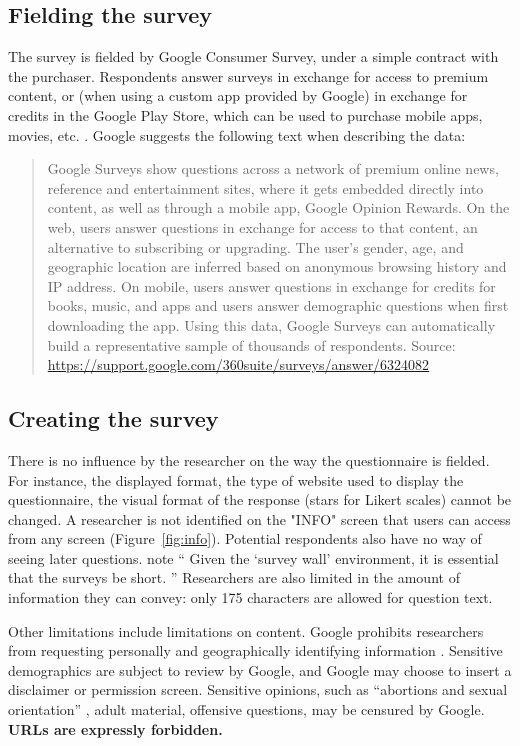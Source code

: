 
\subsection{Fielding the survey}
The survey is fielded by Google Consumer Survey, under a simple contract with the purchaser. Respondents answer surveys in exchange for access to premium content, or (when using a custom app provided by Google) in exchange for credits in the Google Play Store, which can be used to purchase mobile apps, movies, etc. \citep{Google_Inc2016-fj}. Google suggests the following text when describing the data:
\begin{quotation}
	Google Surveys show questions across a network of premium online news, reference and entertainment sites, where it gets embedded directly into content, as well as through a mobile app, Google Opinion Rewards. On the web, users answer questions in exchange for access to that content, an alternative to subscribing or upgrading. The user's gender, age, and geographic location are inferred based on anonymous browsing history and IP address. On mobile, users answer questions in exchange for credits for books, music, and apps and users answer demographic questions when first downloading the app. Using this data, Google Surveys can automatically build a representative sample of thousands of respondents.
	{\footnotesize{Source: \url{https://support.google.com/360suite/surveys/answer/6324082}}}
\end{quotation}

\subsection{Creating the survey}
There is no influence by the researcher on the way the questionnaire is fielded. For instance, the displayed format, the type of website used to display the questionnaire, the visual format of the response (stars for Likert scales) cannot be changed. A researcher is not identified on the "INFO" screen that users can access from any screen (Figure~\ref{fig:info}). Potential respondents also have no way of seeing later questions.  \cite{doi:10.1093/pan/mpw016} note `` Given the  `survey wall' environment, it is essential that the surveys be short. ''  Researchers are also limited in the amount of information they can convey: only 175 characters are allowed for question text.

Other limitations include limitations on content. Google prohibits researchers from requesting personally and geographically identifying information \citep{Google_Inc2017-wi}. Sensitive demographics are subject to review by Google, and Google may choose to insert a disclaimer or permission screen. Sensitive opinions, such as ``abortions and sexual orientation'' \citep{Google_Inc2017-wi}, adult material, offensive questions,  may be censured by Google. 
\textbf{URLs are expressly forbidden.} 

